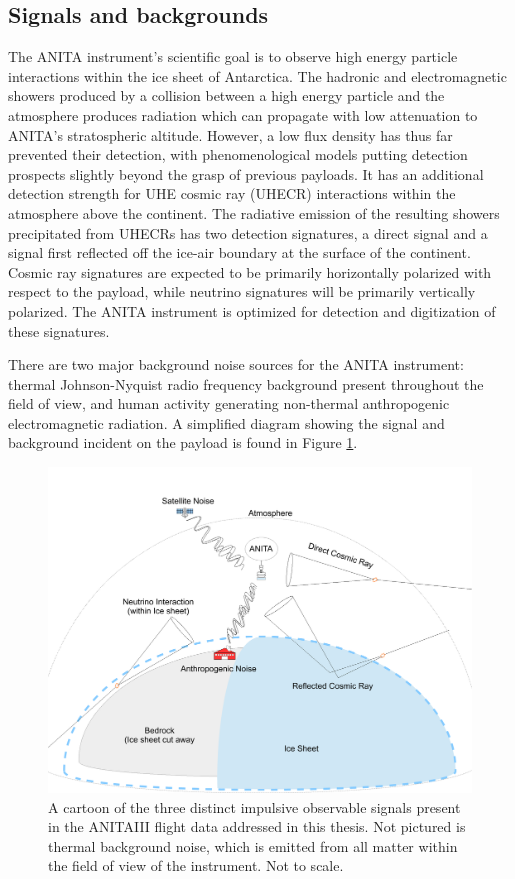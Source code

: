 	\subsection{Signals and backgrounds}
	The ANITA instrument's scientific goal is to observe high energy particle interactions within the ice sheet of Antarctica.  The hadronic and electromagnetic showers produced by a collision between a high energy particle and the atmosphere produces radiation which can propagate with low attenuation to ANITA's stratospheric altitude. However, a low flux density has thus far prevented their detection, with phenomenological models putting detection prospects slightly beyond the grasp of previous payloads.  It has an additional detection strength for UHE cosmic ray (UHECR) interactions within the atmosphere above the continent.  The radiative emission of the resulting showers precipitated from UHECRs has two detection signatures, a direct signal and a signal first reflected off the ice-air boundary at the surface of the continent.  Cosmic ray signatures are expected to be primarily horizontally polarized with respect to the payload, while neutrino signatures will be primarily vertically polarized.  The ANITA instrument is optimized for detection and digitization of these signatures.
	
	There are two major background noise sources for the ANITA instrument: thermal Johnson-Nyquist radio frequency background present throughout the field of view, and human activity generating non-thermal anthropogenic electromagnetic radiation.  A simplified diagram showing the signal and background incident on the payload is found in Figure \ref{fig:AnitaInFlightObservable}.
	
\begin{figure}
\centering
	\includegraphics[width=\textwidth]{figures/AnitaInFlightObservable2}
	\caption{A cartoon of the three distinct impulsive observable signals present in the ANITAIII flight data addressed in this thesis. Not pictured is thermal background noise, which is emitted from all matter within the field of view of the instrument.  Not to scale. }
	\label{fig:AnitaInFlightObservable}
\end{figure}	


